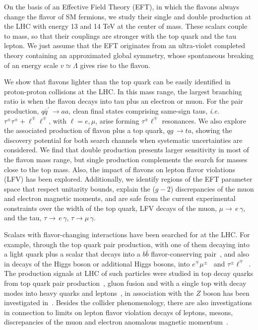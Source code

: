 \documentclass[prd,amsfonts,onecolumn,superscriptaddress,aps,nofootinbib,11pt]{revtex4-1}
\begin{document}
On the basis of an Effective Field Theory (EFT), in which the flavons always change the flavor of SM fermions, we study their single and double production at the LHC with energy 13 and 14 TeV at the center of mass. These scalars couple to mass, so that their couplings are stronger with the top quark and the tau lepton. We just assume that the EFT originates from an ultra-violet completed theory containing an approximated global symmetry, whose spontaneous breaking of an energy scale $v\simeq\Lambda$ gives rise to the flavon. 

We show that flavons lighter than the top quark can be easily identified in proton-proton collisions at the LHC. In this mass range, the largest branching ratio is when the flavon decays into tau plus an electron or muon. For the pair production, $q\bar{q}^\prime\,\rightarrow aa$, clean final states comprising same-sign taus, \textit{i.e.} $\tau^{\pm}\tau^{\pm}+\ell^\mp\ell^\mp$, with $\ell=e,\mu$, arise forming $\tau^\pm\ell^\mp$ resonances. We also explore the associated production of flavon plus a top quark, $qg \,\rightarrow ta$, showing the discovery potential for both search channels when systematic uncertainties are considered. We find that double production presents larger sensitivity in most of the flavon mass range, but single production complements the search for masses close to the top mass. Also, the impact of flavons on lepton flavor violations (LFV) has been explored. Additionally, we identify regions of the EFT parameter space that respect unitarity bounds, explain the ($g-2$) discrepancies of the muon and electron magnetic moments, and are safe from the current experimental constraints over the width of the top quark, LFV decays of the muon, $\mu\rightarrow\,e\,\gamma$, and the tau, $\tau\rightarrow\,e\,\gamma$, $\tau\rightarrow \mu\,\gamma$. 

Scalars with flavor-changing interactions have been searched for at the LHC. For example, through the top quark pair production, with one of them decaying into a light quark plus a scalar that decays into a $b\bar{b}$ flavor-conserving pair~\cite{ATLAS:2023mcc}, and also in decays of the Higgs boson or additional Higgs bosons, into $e^\mp\mu^\pm$~\cite{CMS:2023pte} and $\tau^\pm\ell^\mp$~\cite{ATLAS:2019pmk}.  The production signals at LHC of such particles were studied in top decay quarks from top quark pair production~\cite{Carmona:2022jid,Bhattacharyya:2022umc}, gluon fusion and with a single top with decay modes into heavy quarks and leptons~\cite{Tsumura:2009yf}, in association with the $Z$ boson has been investigated in~\cite{Bhattacharyya:2022ciw}. Besides the collider phenomenology, there are also investigations in connection to limits on lepton flavor violation decays of leptons, mesons, discrepancies of the muon and electron anomalous magnetic momentum~\cite{Cornella:2019uxs,Bauer:2019gfk,Carmona:2021seb,Muong-2:2006rrc,Muong-2:2015xgu,Hanneke_2008,Hanneke:2010au}. 
\end{document}
